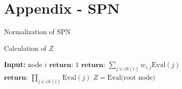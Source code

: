 \section{Appendix - SPN}
Normalization of SPN
\begin{algorithm}
    \caption*{Calculation of $Z$}\label{SPN2}
    \begin{algorithmic}
    \State \textbf{Input:} node $i$ %
     
        \State  $\textbf{return: } 1$ 
    \EndIf
        \State $\textbf{return: } \sum_{j\in ch(i)} w_{i,j} \text{Eval}(j)$
    \EndIf
        \State $\textbf{return: } \prod_{j \in ch(i)} \text{Eval}(j)$
    \EndIf
    \EndFunction
    \State $Z =  \text{Eval(root node)}$
    \end{algorithmic}
\end{algorithm}